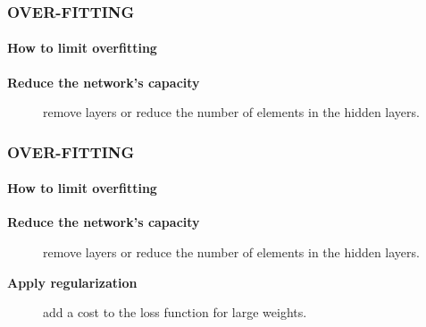 \documentclass[11pt]{beamer}
\begin{document}

\begin{frame}
	\frametitle{\textbf{OVER-FITTING}}
	\framesubtitle{How to limit overfitting}
	\begin{description}
		\item[\color{black}\textbf{Reduce the network's capacity}] remove layers or reduce the number of elements in the hidden layers.
	\end{description}
\end{frame}
\begin{frame}
	\frametitle{\textbf{OVER-FITTING}}
	\framesubtitle{How to limit overfitting}
	\begin{description}
		\item[\color{black}\textbf{Reduce the network's capacity}] remove layers or reduce the number of elements in the hidden layers.
		\item[\color{black}\textbf{Apply regularization}] add a cost to the loss function for large weights.
	\end{description}	
\end{frame}
\end{document}
